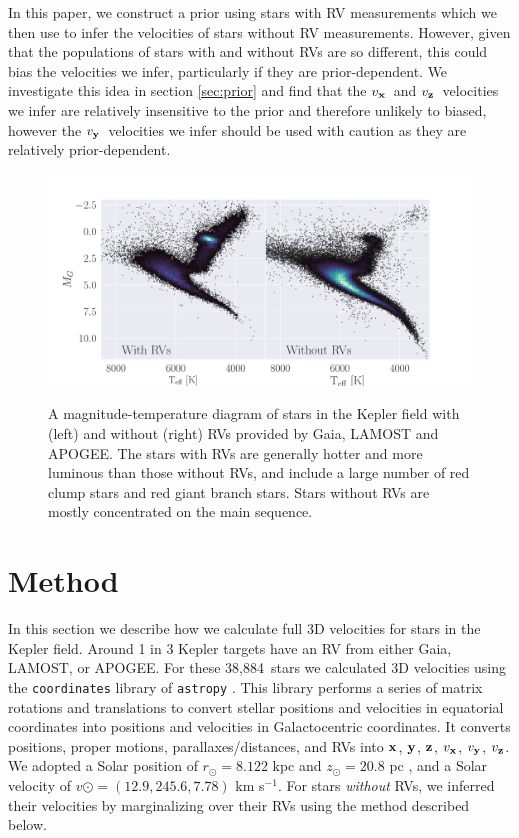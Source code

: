 \documentclass[]{aastex631}
\newcommand{\vx}{$v_{\bf x}$}
\newcommand{\vy}{$v_{\bf y}$}
\newcommand{\vz}{$v_{\bf z}$}
\newcommand{\x}{${\bf x}$}
\newcommand{\y}{${\bf y}$}
\newcommand{\z}{${\bf z}$}
\newcommand{\kms}{km s$^{-1}$}
\newcommand{\nrv}{38,884}
\begin{document}
In this paper, we construct a prior using stars with RV measurements which we
then use to infer the velocities of stars without RV measurements.
However, given that the populations of stars with and without RVs are so
different, this could bias the velocities we infer, particularly if they are
prior-dependent.
We investigate this idea in section \ref{sec:prior} and find that the \vx\ and
\vz\ velocities we infer are relatively insensitive to the prior and therefore
unlikely to biased, however the \vy\ velocities we infer should be used with
caution as they are relatively prior-dependent.
\begin{figure}[ht!]
\caption{
    A magnitude-temperature diagram of stars in the Kepler field with (left)
    and without (right) RVs provided by Gaia, LAMOST and APOGEE.
    The stars with RVs are generally hotter and more luminous than those
    without RVs, and include a large number of red clump stars and red giant
    branch stars.
    Stars without RVs are mostly concentrated on the main sequence.
}
  \centering \includegraphics[width=1\textwidth]{CMD}
\label{fig:CMD}
\end{figure}

\section{Method}
\label{sec:method}

In this section we describe how we calculate full 3D velocities for stars in
the Kepler field.
Around 1 in 3 Kepler targets have an RV from either Gaia, LAMOST, or APOGEE.
For these \nrv\ stars we calculated 3D velocities using the {\tt coordinates}
library of {\tt astropy} \citep{astropy2013, astropy2018}.
This library performs a series of matrix rotations and translations to convert
stellar positions and velocities in equatorial
coordinates into positions and velocities in Galactocentric coordinates.
It converts positions, proper motions, parallaxes/distances, and RVs into \x,
\y, \z, \vx, \vy, \vz.
We adopted a Solar position of $r_\odot = 8.122$ kpc \citep{gravity2018} and
$z_\odot = 20.8$ pc \citep{bennet2019}, and a Solar velocity of $v\odot =
(12.9, 245.6, 7.78)$ \kms \citep{drimmel2018}.
For stars {\it without} RVs, we inferred their velocities by marginalizing
over their RVs using the method described below.
\end{document}
